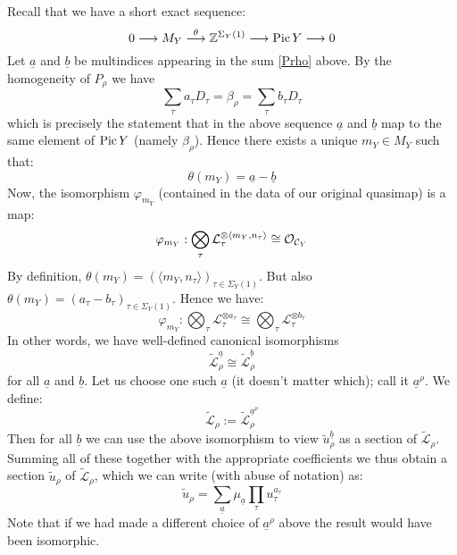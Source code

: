 Recall that we have a short exact sequence:
\begin{equation} \label{Pic short exact sequence for Y} 0 \longrightarrow M_Y \overset{\theta}{\longrightarrow} \mathbb{Z}^{\Sigma_Y(1)} \longrightarrow \operatorname{Pic} Y \longrightarrow 0 \end{equation}
Let $\underline{a}$ and $\underline{b}$ be multindices appearing in the sum \eqref{Prho} above. By the homogeneity of $P_\rho$ we have
\begin{equation*} \sum_\tau a_\tau D_\tau = \beta_\rho = \sum_\tau b_\tau D_\tau \end{equation*}
which is precisely the statement that in the above sequence $\underline{a}$ and $\underline{b}$ map to the same element of $\operatorname{Pic} Y$ (namely $\beta_\rho$). Hence there exists a unique $m_Y \in M_Y$ such that:
\begin{equation*} \theta(m_Y) = \underline{a} - \underline{b} \end{equation*}
Now, the isomorphism $\varphi_{m_Y}$ (contained in the data of our original quasimap) is a map:
\begin{equation*} \varphi_{m_Y} : \bigotimes_\tau \mathcal L_\tau^{\otimes \langle m_Y, n_\tau \rangle} \cong \mathcal{O}_{\mathcal C_Y} \end{equation*}
By definition, $\theta(m_Y) = (\langle m_Y,n_\tau \rangle)_{\tau \in \Sigma_Y(1)}$. But also $\theta(m_Y) = (a_\tau - b_\tau)_{\tau \in \Sigma_Y(1)}$. Hence we have:
\begin{equation*} \varphi_{m_Y} : \bigotimes_\tau \mathcal L_\tau^{\otimes a_\tau} \cong \bigotimes_\tau \mathcal L_\tau^{\otimes b_\tau} \end{equation*}
In other words, we have well-defined canonical isomorphisms
\begin{equation*} \tilde{\mathcal L}_\rho^{\underline{a}} \cong \tilde{\mathcal L}_\rho^{\underline{b}} \end{equation*}
for all $\underline{a}$ and $\underline{b}$. Let us choose one such $\underline{a}$ (it doesn't matter which); call it $\underline{a}^\rho$. We define:
\begin{equation*} \tilde{\mathcal L}_\rho := \tilde{\mathcal L}_\rho^{\underline{a}^\rho} \end{equation*}
Then for all $\underline{b}$ we can use the above isomorphism to view $\tilde{u}_\rho^{\underline{b}}$ as a section of $\tilde{\mathcal L}_\rho$. Summing all of these together with the appropriate coefficients we thus obtain a section $\tilde{u}_\rho$ of $\tilde{\mathcal L}_\rho$, which we can write (with abuse of notation) as:
\begin{equation*} \tilde{u}_\rho = \sum_{\underline{a}} \mu_{\underline{a}} \prod_\tau u_\tau^{a_\tau} \end{equation*}
Note that if we had made a different choice of $\underline{a}^\rho$ above the result would have been isomorphic.


